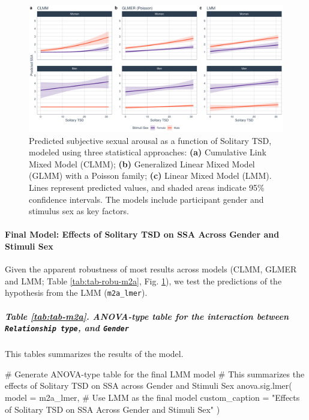 \documentclass[
  bookmarksnumbered]{article}
\newenvironment{Shaded}{\begin{snugshade}}{\end{snugshade}}
\newcommand{\AttributeTok}[1]{\textcolor[rgb]{0.80,0.80,0.80}{#1}}
\newcommand{\CommentTok}[1]{\textcolor[rgb]{0.50,0.62,0.50}{#1}}
\newcommand{\FunctionTok}[1]{\textcolor[rgb]{0.94,0.94,0.56}{#1}}
\newcommand{\NormalTok}[1]{\textcolor[rgb]{0.80,0.80,0.80}{#1}}
\newcommand{\StringTok}[1]{\textcolor[rgb]{0.80,0.58,0.58}{#1}}
\begin{document}
\begin{figure}
\centering
\includegraphics{Sexual_Desire_Arousal_files/figure-latex/preds-m2a-1.pdf}
\caption{\label{fig:preds-m2a}Predicted subjective sexual arousal as a function of Solitary TSD, modeled using three statistical approaches: \textbf{(a)} Cumulative Link Mixed Model (CLMM); \textbf{(b)} Generalized Linear Mixed Model (GLMM) with a Poisson family; \textbf{(c)} Linear Mixed Model (LMM). Lines represent predicted values, and shaded areas indicate 95\% confidence intervals. The models include participant gender and stimulus sex as key factors.}
\end{figure}

\paragraph{Final Model: Effects of Solitary TSD on SSA Across Gender and Stimuli Sex}\label{final-model-effects-of-solitary-tsd-on-ssa-across-gender-and-stimuli-sex}

Given the apparent robustness of most results across models (CLMM, GLMER and LMM; Table \ref{tab:tab-robu-m2a}, Fig. \ref{fig:preds-m2a}), we test the predictions of the hypothesis from the LMM (\texttt{m2a\_lmer}).

\subparagraph{\texorpdfstring{Table \ref{tab:tab-m2a}. ANOVA-type table for the interaction between \texttt{Relationship\ type}, and \texttt{Gender}}{Table \ref{tab:tab-m2a}. ANOVA-type table for the interaction between Relationship type, and Gender}}\label{table-reftabtab-m2a.-anova-type-table-for-the-interaction-between-relationship-type-and-gender}

This tables summarizes the results of the model.

\begin{Shaded}
\begin{Highlighting}[]
\CommentTok{\# Generate ANOVA{-}type table for the final LMM model}
\CommentTok{\# This summarizes the effects of Solitary TSD on SSA across Gender and Stimuli Sex}
\FunctionTok{anova.sig.lmer}\NormalTok{(}
  \AttributeTok{model =}\NormalTok{ m2a\_lmer, }\CommentTok{\# Use LMM as the final model}
  \AttributeTok{custom\_caption =} \StringTok{"Effects of Solitary TSD on SSA Across Gender and Stimuli Sex"}
\NormalTok{)}
\end{Highlighting}
\end{Shaded}
\end{document}
